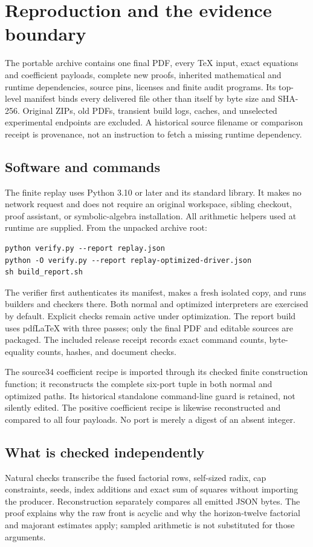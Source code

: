 \section{Reproduction and the evidence boundary}
The portable archive contains one final PDF, every TeX input, exact equations and coefficient payloads, complete new proofs, inherited mathematical and runtime dependencies, source pins, licenses and finite audit programs. Its top-level manifest binds every delivered file other than itself by byte size and SHA-256. Original ZIPs, old PDFs, transient build logs, caches, and unselected experimental endpoints are excluded. A historical source filename or comparison receipt is provenance, not an instruction to fetch a missing runtime dependency.

\subsection{Software and commands}
The finite replay uses Python 3.10 or later and its standard library. It makes no network request and does not require an original workspace, sibling checkout, proof assistant, or symbolic-algebra installation. All arithmetic helpers used at runtime are supplied. From the unpacked archive root:
\begin{verbatim}
python verify.py --report replay.json
python -O verify.py --report replay-optimized-driver.json
sh build_report.sh
\end{verbatim}
The verifier first authenticates its manifest, makes a fresh isolated copy, and runs builders and checkers there. Both normal and optimized interpreters are exercised by default. Explicit checks remain active under optimization. The report build uses pdfLaTeX with three passes; only the final PDF and editable sources are packaged. The included release receipt records exact command counts, byte-equality counts, hashes, and document checks.

The source34 coefficient recipe is imported through its checked finite construction function; it reconstructs the complete six-port tuple in both normal and optimized paths. Its historical standalone command-line guard is retained, not silently edited. The positive coefficient recipe is likewise reconstructed and compared to all four payloads. No port is merely a digest of an absent integer.

\subsection{What is checked independently}
Natural checks transcribe the fused factorial rows, self-sized radix, cap constraints, seeds, index additions and exact sum of squares without importing the producer. Reconstruction separately compares all emitted JSON bytes. The proof explains why the raw front is acyclic and why the horizon-twelve factorial and majorant estimates apply; sampled arithmetic is not substituted for those arguments.

